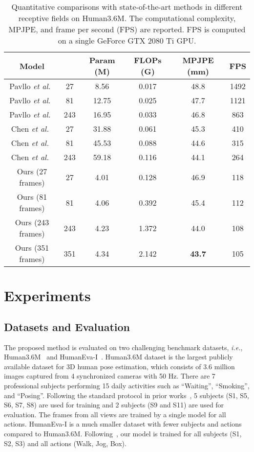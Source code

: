 \documentclass[journal]{IEEEtran}
\begin{document}
\begin{table}[ht]
   \centering
   \caption
   { 
      Quantitative comparisons with state-of-the-art methods in different receptive fields on Human3.6M. 
      The computational complexity, MPJPE, and frame per second (FPS) are reported. 
      FPS is computed on a single GeForce GTX 2080 Ti GPU.
   }  
   \setlength{\tabcolsep}{1.10mm} 
   \begin{tabular}{cccccc}
   \toprule [1pt]
   Model & &Param (M) &FLOPs (G) &MPJPE (mm) &FPS \\
   \midrule [0.5pt]  
   Pavllo \emph{et al.}~\cite{pavllo20193d} &27 &8.56 &0.017 &48.8 &1492 \\
   Pavllo \emph{et al.}~\cite{pavllo20193d} &81 &12.75 &0.025 &47.7 &1121 \\
   Pavllo \emph{et al.}~\cite{pavllo20193d} &243 &16.95 &0.033 &46.8 &863 \\
   Chen \emph{et al.}~\cite{chen2021anatomy} &27 &31.88 &0.061 &45.3 &410 \\
   Chen \emph{et al.}~\cite{chen2021anatomy} &81 &45.53 &0.088  &44.6 &315 \\
   Chen \emph{et al.}~\cite{chen2021anatomy} &243 &59.18 &0.116 &44.1 &264 \\
   \midrule [0.5pt]

   Ours (27 frames) &27 &4.01 &0.128 &46.9 &118 \\
   Ours (81 frames) &81 &4.06 &0.392 &45.4 &112 \\
   Ours (243 frames) &243 &4.23 &1.372 &44.0 &108 \\
   Ours (351 frames) &351 &4.34 &2.142 &\textbf{43.7} &105 \\

   \toprule [1pt]
   \end{tabular}
   \label{table:compare}
\end{table}

\section{Experiments}
\subsection{Datasets and Evaluation}
The proposed method is evaluated on two challenging benchmark datasets, \emph{i.e.}, Human3.6M~\cite{ionescu2013human3} and HumanEva-I~\cite{sigal2010humaneva}. 
Human3.6M dataset is the largest publicly available dataset for 3D human pose estimation, which consists of 3.6 million images captured from 4 synchronized cameras with 50 Hz. 
There are 7 professional subjects performing 15 daily activities such as “Waiting”, “Smoking”, and “Posing”.
Following the standard protocol in prior works~\cite{chen2019weakly,tome2018rethinking,pavllo20193d}, 5 subjects (S1, S5, S6, S7, S8) are used for training and 2 subjects (S9 and S11) are used for evaluation. 
The frames from all views are trained by a single model for all actions. 
HumanEva-I is a much smaller dataset with fewer subjects and actions compared to Human3.6M. 
Following~\cite{pavllo20193d,lee2018propagating}, our model is trained for all subjects (S1, S2, S3) and all actions (Walk, Jog, Box). 
\end{document}
